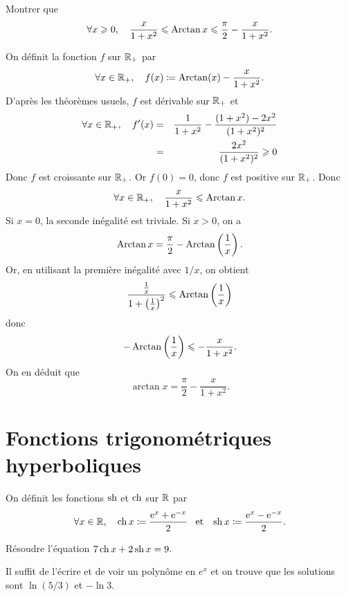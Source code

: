 \documentclass{magnolia}
\begin{document}
\begin{exoUnique}
\exemple Montrer que
  \[\forall x\geqslant 0 ,\quad
    \frac{x}{1+x^2}\leqslant\operatorname{Arctan} x\leqslant\frac{\pi}{2}-\frac{x}{1+x^2}.\]
  \begin{sol}
  On définit la fonction $f$ sur $\mathbb{R}_+$ par
  \[\forall x\in\mathbb{R}_+,\quad f(x)\coloneqq \operatorname{Arctan}(x)-\frac{x}{1+x^2}.\]
  D'après les théorèmes usuels, $f$ est dérivable sur $\mathbb{R}_+$ et
  \begin{eqnarray*}
  \forall x\in\mathbb{R}_+,\quad f'(x)
  &=& \frac{1}{1+x^2}-\frac{(1+x^2)-2x^2}{(1+x^2)^2}\\
  &=& \frac{2x^2}{(1+x^2)^2}\geqslant 0
  \end{eqnarray*}
  Donc $f$ est croissante sur $\mathbb{R}_+$. Or $f(0)=0$, donc $f$ est positive sur $\mathbb{R}_+$. Donc
  \[\forall x\in\mathbb{R}_+,\quad \frac{x}{1+x^2}\leqslant\operatorname{Arctan} x.\]
  Si $x=0$, la seconde inégalité est triviale. Si $x>0$, on a
  \[\operatorname{Arctan} x =\frac{\pi}{2}-\operatorname{Arctan}\left(\frac{1}{x}\right).\]
  Or, en utilisant la première inégalité avec $1/x$, on obtient
  \[\frac{\frac{1}{x}}{1+\left(\frac{1}{x}\right)^2}\leqslant\operatorname{Arctan}\left(\frac{1}{x}\right)\]
  donc
  \[-\operatorname{Arctan}\left(\frac{1}{x}\right)\leqslant -\frac{x}{1+x^2}.\]
  On en déduit que
  \[\arctan x =\frac{\pi}{2}-\frac{x}{1+x^2}.\]
  \end{sol}
\end{exoUnique}

\section{Fonctions trigonométriques hyperboliques}

\begin{definition}[utile=-3]
On définit les fonctions $\operatorname{sh}$ et $\operatorname{ch}$ sur $\mathbb{R}$ par
\[\forall x\in\mathbb{R} ,\quad \operatorname{ch} x\coloneqq\frac{{\rm e}^x+{\rm e}^{-x}}{2} \quad\!\text{et}\quad\!
                       \operatorname{sh} x\coloneqq\frac{{\rm e}^x-{\rm e}^{-x}}{2}.\]
\end{definition}

\begin{exoUnique}
\exo Résoudre l'équation $7\operatorname{ch} x+2\operatorname{sh} x=9$.
  \begin{sol}
  Il suffit de l'écrire et de voir un polynôme en $e^x$ et on trouve que les solutions sont $\ln(5/3)$ et $-\ln 3$.
  \end{sol}
\end{exoUnique}
\end{document}

